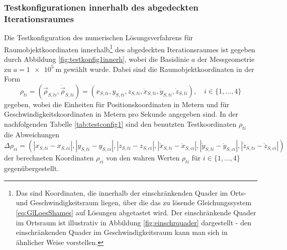 \documentclass[a4paper,12pt]{article}
\numberwithin{equation}{section}
\begin{document}
\subsubsection{Testkonfigurationen innerhalb des abgedeckten Iterationsraumes}\label{sec:testkonfig1}
Die Testkonfiguration des numerischen Lösungsverfahrens für Raumobjektkoordinaten innerhalb\footnote{Das sind Koordinaten, die innerhalb der einschränkenden Quader im Orts- und Geschwindigkeitsraum liegen, über die das zu lösende Gleichungssystem \eqref{eq:GlLoesShames} auf Lösungen abgetastet wird. Der einschränkende Quader im Ortsraum ist illustrativ in Abbildung \ref{fig:einschrquader} dargestellt - den einschränkenden Quader im Geschwindigkeitsraum kann man sich in ähnlicher Weise vorstellen.} des abgedeckten Iterationsraumes ist gegeben durch Abbildung \ref{fig:testkonfig1innerh}, wobei die Basislinie $a$ der Messgeometrie zu $a = \SI{1e5}{\meter}$ gewählt wurde. Dabei sind die Raumobjektkoordinaten in der Form \begin{equation}
\rho_{ti} = (\vec{\rho}_{S,ti},\dot{\vec{\rho}}_{S,ti}) =  (x_{S,ti},y_{S,ti},z_{S,ti},\dot{x}_{S,ti},\dot{y}_{S,ti},\dot{z}_{S,ti}), \quad i \in \{1,\dots,4\}
\end{equation} gegeben, wobei die Einheiten für Positionskoordinaten in Metern und für Geschwindigkeitskoordinaten in Metern pro Sekunde angegeben sind. In der nachfolgenden Tabelle \ref{tab:testconfig1} sind den benutzten Testkoordinaten $\rho_{ti}$ die Abweichungen \begin{equation} \Delta \rho_{ci} = (|x_{S,ti}-x_{S,ci}|,|y_{S,ti}-y_{S,ci}|,|z_{S,ti}-z_{S,ci}|,|\dot{x}_{S,ti}-\dot{x}_{S,ci}|,|\dot{y}_{S,ti}-\dot{y}_{S,ci}|,|\dot{z}_{S,ti}-\dot{z}_{S,ci}|)\end{equation} der berechneten Koordinaten $\rho_{ci}$ von den wahren Werten $\rho_{ti}$ für $ i \in \{1,\dots,4\}$ gegenübergestellt.
\end{document}

